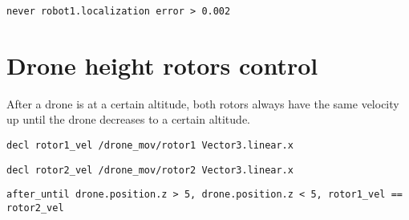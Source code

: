 \texttt{never robot1.localization error > 0.002}


\section{Drone height rotors control}

After a drone is at a certain altitude, both rotors always have the same velocity up until the drone decreases to a certain altitude.


\texttt{decl rotor1\_vel /drone\_mov/rotor1 Vector3.linear.x}

\texttt{decl rotor2\_vel /drone\_mov/rotor2 Vector3.linear.x}


\texttt{after\_until drone.position.z > 5, drone.position.z < 5, rotor1\_vel == rotor2\_vel}
